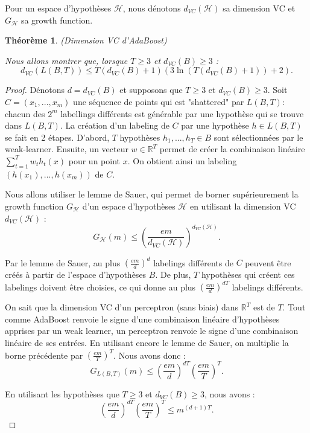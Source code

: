 \documentclass[12pt]{article}
\newcommand{\R}{\mathbb{R}}
\newtheorem{theorem}{Théorème}
\begin{document}
	Pour un espace d'hypothèses $\mathcal{H}$, nous dénotons $d_{VC}(\mathcal{H})$ sa dimension VC et $G_{\mathcal{H}}$ sa growth function.
	
	\begin{theorem}{(Dimension VC d'AdaBoost)}
		
		Nous allons montrer que, lorsque $T \geq 3$ et $d_{VC}(B) \geq 3$ :
		\[
		d_{VC}(L(B, T)) \leq T(d_{VC}(B) + 1) (3 \ln(T (d_{VC}(B) + 1)) + 2).
		\]
	\end{theorem}

	\begin{proof}
	
	Dénotons $d = d_{VC}(B)$ et supposons que $T \geq 3$ et $d_{VC}(B) \geq 3$.
	Soit $C = (x_1, ..., x_m)$ une séquence de points qui est "shattered" par $L(B, T)$: chacun des $2^m$ labellings différents est générable par une hypothèse qui se trouve dans $L(B, T)$.
	La création d'un labeling de $C$ par une hypothèse $h \in L(B, T)$ se fait en 2 étapes.
	D'abord, $T$ hypothèses $h_1, ..., h_T \in B$ sont sélectionnées par le weak-learner.
	Ensuite, un vecteur $w \in \R^T$ permet de créer la combinaison linéaire $\sum_{t=1}^T w_t h_t(x)$ pour un point $x$.
	On obtient ainsi un labeling $(h(x_1), ..., h(x_m))$ de $C$.
	
	Nous allons utiliser le lemme de Sauer, qui permet de borner supérieurement la growth function $G_{\mathcal{H}}$ d'un espace d'hypothèses $\mathcal{H}$ en utilisant la dimension VC $d_{VC}(\mathcal{H})$ :
	\[
	G_{\mathcal{H}}(m) \leq \left( \frac{em}{d_{VC}(\mathcal{H})} \right) ^{d_{VC}(\mathcal{H})}.
	\]
	
	Par le lemme de Sauer, au plus $\left( \frac{em}{d} \right)^{d}$ labelings différents de $C$ peuvent être créés à partir de l'espace d'hypothèses $B$.
	De plus, $T$ hypothèses qui créent ces labelings doivent être choisies, ce qui donne au plus $\left( \frac{em}{d} \right) ^{d T}$ labelings différents.
	
	On sait que la dimension VC d'un perceptron (sans biais) dans $\R^T$ est de $T$.
	Tout comme AdaBoost renvoie le signe d'une combinaison linéaire d'hypothèses apprises par un weak learner, un perceptron renvoie le signe d'une combinaison linéaire de ses entrées.
	En utilisant encore le lemme de Sauer, on multiplie la borne précédente par $\left( \frac{em}{T} \right)^{T}$.
	Nous avons donc :
	\[
	G_{L(B, T)}(m) \leq \left( \frac{em}{d} \right) ^{d T} \left( \frac{em}{T} \right)^{T}.
	\]
	
	En utilisant les hypothèses que $T \geq 3$ et $d_{VC}(B) \geq 3$, nous avons :
	\[
	\left( \frac{em}{d} \right) ^{d T} \left( \frac{em}{T} \right)^{T} \leq m^{(d + 1) T}.
	\]
	

\end{proof}
\end{document}

